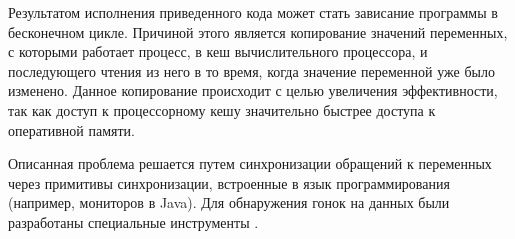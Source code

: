\documentclass[14pt, openany]{book}
\begin{document}


Результатом исполнения приведенного кода может стать зависание программы в бесконечном цикле. Причиной этого является копирование значений переменных, с которыми работает процесс, в кеш вычислительного процессора, и последующего чтения из него в то время, когда значение переменной уже было изменено. Данное копирование происходит с целью увеличения эффективности, так как доступ к процессорному кешу значительно быстрее \cite{timings} доступа к оперативной памяти. \par
Описанная проблема решается путем синхронизации обращений к переменных через примитивы синхронизации, встроенные в язык программирования (например, мониторов в Java). Для обнаружения гонок на данных были разработаны специальные инструменты \cite{threadSanitizer, javaThreadSanitizer}.
\end{document}
